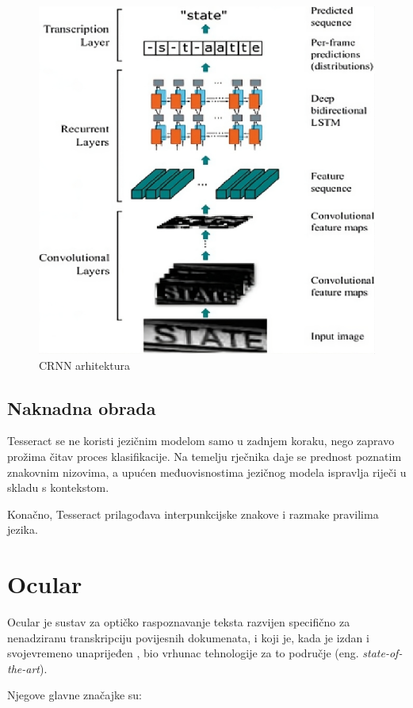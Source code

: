 \documentclass[zavrsnirad]{fer}
\begin{document}
\begin{figure}[h!]
	\centering
	\includegraphics[width=0.7\linewidth]{Figures/CRNN-architecture.jpeg} 
	\caption{CRNN arhitektura \cite{Dharmale2023}}
	\label{slk:crnn}
\end{figure}


\section{Naknadna obrada}

Tesseract se ne koristi jezičnim modelom samo u zadnjem koraku, nego zapravo prožima čitav proces klasifikacije. Na temelju rječnika daje se prednost poznatim znakovnim nizovima, a upućen međuovisnostima jezičnog modela ispravlja riječi u skladu s kontekstom.

Konačno, Tesseract prilagođava interpunkcijske znakove i razmake pravilima jezika.



\chapter{Ocular}
\label{pog:ocular}

Ocular \cite{Berg2013} je sustav za optičko raspoznavanje teksta razvijen specifično za nenadziranu transkripciju povijesnih dokumenata, i koji je, kada je izdan i svojevremeno unaprijeđen \cite{Berg2014}, bio vrhunac tehnologije za to područje (eng. \textit{state-of-the-art}).

Njegove glavne značajke su: \cite{Ocular}
\end{document}
